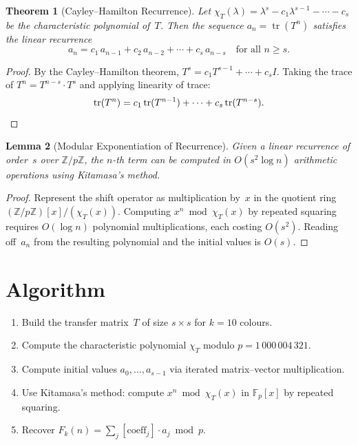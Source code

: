 \documentclass[11pt]{article}
\newtheorem{theorem}{Theorem}
\newtheorem{lemma}[theorem]{Lemma}
\begin{document}
\begin{theorem}[Cayley--Hamilton Recurrence]
Let $\chi_T(\lambda) = \lambda^s - c_1 \lambda^{s-1} - \cdots - c_s$ be the characteristic polynomial of~$T$. Then the sequence $a_n = \operatorname{tr}(T^n)$ satisfies the linear recurrence
\[
  a_n = c_1\, a_{n-1} + c_2\, a_{n-2} + \cdots + c_s\, a_{n-s} \quad \text{for all } n \ge s.
\]
\end{theorem}

\begin{proof}
By the Cayley--Hamilton theorem, $T^s = c_1 T^{s-1} + \cdots + c_s I$. Taking the trace of $T^n = T^{n-s} \cdot T^s$ and applying linearity of trace:
\[
  \operatorname{tr}(T^n) = c_1 \operatorname{tr}(T^{n-1}) + \cdots + c_s \operatorname{tr}(T^{n-s}). \qedhere
\]
\end{proof}

\begin{lemma}[Modular Exponentiation of Recurrence]
Given a linear recurrence of order~$s$ over $\mathbb{Z}/p\mathbb{Z}$, the $n$-th term can be computed in $O(s^2 \log n)$ arithmetic operations using Kitamasa's method.
\end{lemma}

\begin{proof}
Represent the shift operator as multiplication by~$x$ in the quotient ring $(\mathbb{Z}/p\mathbb{Z})[x]/(\chi_T(x))$. Computing $x^n \bmod \chi_T(x)$ by repeated squaring requires $O(\log n)$ polynomial multiplications, each costing $O(s^2)$. Reading off~$a_n$ from the resulting polynomial and the initial values is $O(s)$.
\end{proof}

\section{Algorithm}

\begin{enumerate}
  \item Build the transfer matrix~$T$ of size $s \times s$ for $k = 10$ colours.
  \item Compute the characteristic polynomial $\chi_T$ modulo $p = 1\,000\,004\,321$.
  \item Compute initial values $a_0, \ldots, a_{s-1}$ via iterated matrix--vector multiplication.
  \item Use Kitamasa's method: compute $x^n \bmod \chi_T(x)$ in $\mathbb{F}_p[x]$ by repeated squaring.
  \item Recover $F_k(n) = \sum_j [\text{coeff}_j] \cdot a_j \bmod p$.
\end{enumerate}
\end{document}
